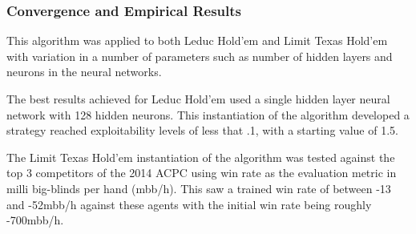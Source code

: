 \subsubsection{Convergence and Empirical Results}
This algorithm was applied to both Leduc Hold'em and Limit Texas Hold'em with variation in a number
of parameters such as number of hidden layers and neurons in the neural networks.

The best results achieved for Leduc Hold'em used a single hidden layer neural network with 128 hidden neurons.
This instantiation of the algorithm developed a strategy reached exploitability levels of less that .1, with
a starting value of 1.5.

The Limit Texas Hold'em instantiation of the algorithm was tested against the top 3 competitors of
the 2014 ACPC using win rate as the evaluation metric in milli big-blinds per hand (mbb/h).
This saw a trained win rate of between -13 and -52mbb/h against these agents with the initial win rate being
roughly -700mbb/h.